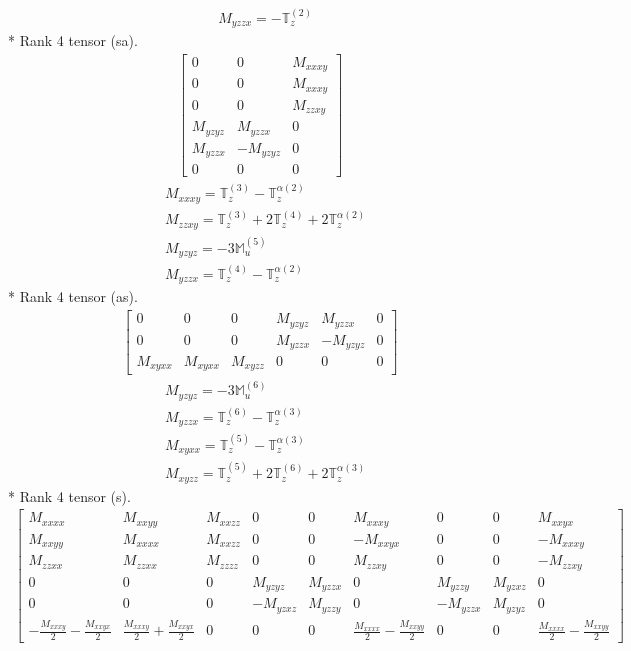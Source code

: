 \documentclass[fleqn,8pt,landscape]{jsarticle}
\begin{document}
\begin{align*}
& M_{yzzx} = - \mathbb{T}_{z}^{(2)}
\end{align*}
* Rank 4 tensor (sa).
\begin{align*}
\begin{bmatrix} 0 & 0 & M_{xxxy} \\ 0 & 0 & M_{xxxy} \\ 0 & 0 & M_{zzxy} \\ M_{yzyz} & M_{yzzx} & 0 \\ M_{yzzx} & - M_{yzyz} & 0 \\ 0 & 0 & 0 \end{bmatrix}
\end{align*}
\begin{align*}
& M_{xxxy} = \mathbb{T}_{z}^{(3)} - \mathbb{T}_{z}^{\alpha(2)} \\
& M_{zzxy} = \mathbb{T}_{z}^{(3)} + 2 \mathbb{T}_{z}^{(4)} + 2 \mathbb{T}_{z}^{\alpha(2)} \\
& M_{yzyz} = - 3 \mathbb{M}_{u}^{(5)} \\
& M_{yzzx} = \mathbb{T}_{z}^{(4)} - \mathbb{T}_{z}^{\alpha(2)}
\end{align*}
* Rank 4 tensor (as).
\begin{align*}
\begin{bmatrix} 0 & 0 & 0 & M_{yzyz} & M_{yzzx} & 0 \\ 0 & 0 & 0 & M_{yzzx} & - M_{yzyz} & 0 \\ M_{xyxx} & M_{xyxx} & M_{xyzz} & 0 & 0 & 0 \end{bmatrix}
\end{align*}
\begin{align*}
& M_{yzyz} = - 3 \mathbb{M}_{u}^{(6)} \\
& M_{yzzx} = \mathbb{T}_{z}^{(6)} - \mathbb{T}_{z}^{\alpha(3)} \\
& M_{xyxx} = \mathbb{T}_{z}^{(5)} - \mathbb{T}_{z}^{\alpha(3)} \\
& M_{xyzz} = \mathbb{T}_{z}^{(5)} + 2 \mathbb{T}_{z}^{(6)} + 2 \mathbb{T}_{z}^{\alpha(3)}
\end{align*}
* Rank 4 tensor (s).
\begin{align*}
\begin{bmatrix} M_{xxxx} & M_{xxyy} & M_{xxzz} & 0 & 0 & M_{xxxy} & 0 & 0 & M_{xxyx} \\ M_{xxyy} & M_{xxxx} & M_{xxzz} & 0 & 0 & - M_{xxyx} & 0 & 0 & - M_{xxxy} \\ M_{zzxx} & M_{zzxx} & M_{zzzz} & 0 & 0 & M_{zzxy} & 0 & 0 & - M_{zzxy} \\ 0 & 0 & 0 & M_{yzyz} & M_{yzzx} & 0 & M_{yzzy} & M_{yzxz} & 0 \\ 0 & 0 & 0 & - M_{yzxz} & M_{yzzy} & 0 & - M_{yzzx} & M_{yzyz} & 0 \\ - \frac{M_{xxxy}}{2} - \frac{M_{xxyx}}{2} & \frac{M_{xxxy}}{2} + \frac{M_{xxyx}}{2} & 0 & 0 & 0 & \frac{M_{xxxx}}{2} - \frac{M_{xxyy}}{2} & 0 & 0 & \frac{M_{xxxx}}{2} - \frac{M_{xxyy}}{2} \end{bmatrix}
\end{align*}
\end{document}
